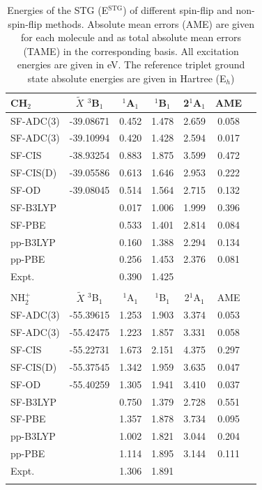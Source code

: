 \documentclass[aip,graphicx,amsmath,reprint]{revtex4-1}
\begin{document}
\begin{table}
\caption{\label{tab:carbene1} Energies of the STG (E$^{{\text{STG}}}$) of different spin-flip and non-spin-flip methods. Absolute mean errors (AME) are given for each molecule and as total absolute mean errors (TAME) in the corresponding basis. All excitation energies are given in eV. The reference triplet ground state absolute energies are given in Hartree (E$_h$)}
\begin{ruledtabular}
\begin{tabular}{lcccccc}
CH$_2$&${\tilde{X}}$ $^3$B$_1$&$^1$A$_1$&$^1$B$_1$&2$^1$A$_1$&AME\\
\hline
SF-ADC(3)\footnotemark[1]&-39.08671&0.452&1.478&2.659&0.058\\
SF-ADC(3)\footnotemark[2]&-39.10994 &0.420&1.428&2.594&0.017\\
SF-CIS\footnotemark[3]&-38.93254&0.883&1.875&3.599&0.472\\
SF-CIS(D)\footnotemark[3]&-39.05586&0.613&1.646&2.953&0.222\\
SF-OD\footnotemark[3]&-39.08045&0.514&1.564&2.715&0.132\\
SF-B3LYP\footnotemark[4]&&0.017&1.006&1.999&0.396\\
SF-PBE\footnotemark[4]&&0.533&1.401&2.814&0.084\\
pp-B3LYP\footnotemark[5]&&0.160&1.388&2.294&0.134\\
pp-PBE\footnotemark[5]&&0.256&1.453&2.376&0.081\\
Expt.&&0.390\footnotemark[6]&1.425\footnotemark[6]&\\
&&&&&\\
NH$_2^+$&${\tilde{X}}$ $^3$B$_1$&$^1$A$_1$&$^1$B$_1$&2$^1$A$_1$&AME\\
\hline
SF-ADC(3)\footnotemark[1]&-55.39615&1.253&1.903&3.374&0.053\\
SF-ADC(3)\footnotemark[2]&-55.42475&1.223&1.857&3.331&0.058\\
SF-CIS\footnotemark[3]&-55.22731&1.673&2.151&4.375&0.297\\
SF-CIS(D)\footnotemark[3]&-55.37545&1.342&1.959&3.635&0.047\\
SF-OD\footnotemark[3]&-55.40259&1.305&1.941&3.410&0.037\\
SF-B3LYP\footnotemark[4]&&0.750&1.379&2.728&0.551\\
SF-PBE\footnotemark[4]&&1.357&1.878&3.734&0.095\\
pp-B3LYP\footnotemark[5]&&1.002&1.821&3.044&0.204\\
pp-PBE\footnotemark[5]&&1.114&1.895&3.144&0.111\\
Expt.&&1.306\footnotemark[6]&1.891\footnotemark[7]&\\
&&&&&\\


\end{tabular}
\end{ruledtabular}
\end{table}
\end{document}
